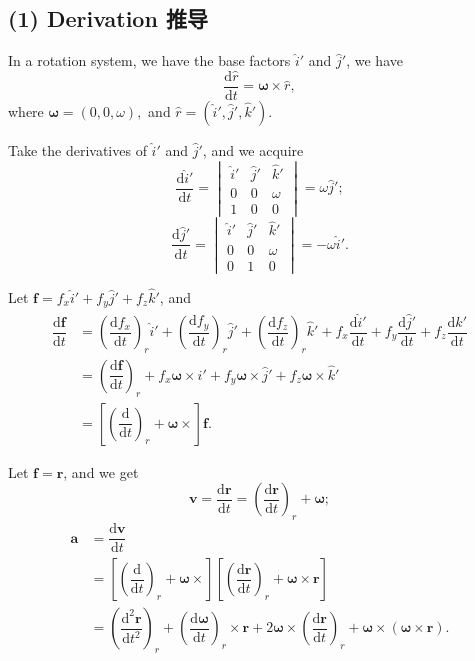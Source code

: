 \subsection*{(1) Derivation 推导}\label{derivation-ux63a8ux5bfc-1}

In a rotation system, we have the base factors \(\hat i'\) and
\(\hat j'\), we have
\[\dfrac{\mathrm d \hat r}{\mathrm dt} = \boldsymbol \omega \times \hat r,\]
where \(\boldsymbol \omega = (0, 0, \omega),\) and
\(\hat r = (\hat i', \hat j', \hat k')\).

Take the derivatives of \(\hat i'\) and \(\hat j'\), and we acquire
\[\dfrac{\mathrm d \hat i'}{\mathrm dt} = 
    \begin{vmatrix}
        \hat i' & \hat j' & \hat k' \\
        0 & 0 & \omega \\
        1 & 0 & 0
    \end{vmatrix}
= \omega \hat j';\]
\[\dfrac{\mathrm d \hat j'}{\mathrm dt} = \begin{vmatrix}
\hat i' & \hat j' & \hat k' \\
0 & 0 & \omega \\
0 & 1 & 0
\end{vmatrix}
= - \omega \hat i'.\]

Let \(\boldsymbol f = f_x \hat i' + f_y \hat j' + f_z \hat k'\), and
\begin{align*}
    \dfrac{\mathrm d \boldsymbol f}{\mathrm dt} & = \left( \dfrac{\mathrm df_x}{\mathrm dt} \right)_r \hat i' + \left( \dfrac{\mathrm df_y}{\mathrm dt} \right)_r \hat j' + \left( \dfrac{\mathrm df_z}{\mathrm dt} \right)_r \hat k' + f_x \dfrac{\mathrm d \hat i'}{\mathrm dt} + f_y \dfrac{\mathrm d \hat j'}{\mathrm dt} + f_z \dfrac{\mathrm d \hat k'}{\mathrm dt} \\
    & = \left( \dfrac{\mathrm d \boldsymbol f}{\mathrm dt} \right)_r + f_x \boldsymbol \omega \times \hat i' + f_y \boldsymbol \omega \times \hat j' + f_z \boldsymbol \omega \times \hat k' \\
    & = \left[ \left( \dfrac{\mathrm d}{\mathrm dt}\right)_r + \boldsymbol \omega \times \right] \boldsymbol f.
\end{align*}

Let \(\boldsymbol f = \boldsymbol r\), and we get
\[\boldsymbol v = \dfrac{\mathrm d \boldsymbol r}{\mathrm dt} = \left( \dfrac{\mathrm d \boldsymbol r}{\mathrm dt}\right)_r + \boldsymbol \omega;\]
\begin{align*}
    \boldsymbol a & = \dfrac{\mathrm d \boldsymbol v}{\mathrm dt} \\
    & = \left[ \left( \dfrac{\mathrm d}{\mathrm dt}\right)_r + \boldsymbol \omega \times \right] \left[ \left( \dfrac{\mathrm d \boldsymbol r}{\mathrm dt}\right)_r + \boldsymbol \omega \times \boldsymbol r \right] \\
    & = \left( \dfrac{\mathrm d^2 \boldsymbol r}{\mathrm dt^2}\right)_r + \left( \dfrac{\mathrm d \boldsymbol \omega}{\mathrm dt}\right)_r \times \boldsymbol r + 2 \boldsymbol \omega \times \left( \dfrac{\mathrm d \boldsymbol r}{\mathrm dt}\right)_r + \boldsymbol \omega \times (\boldsymbol \omega \times \boldsymbol r).
\end{align*}

